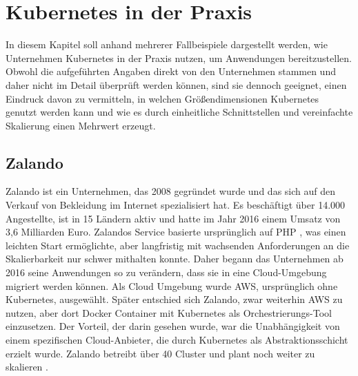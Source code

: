 \documentclass[11pt,a4paper]{article}
\begin{document}
\section{Kubernetes in der Praxis}
In diesem Kapitel soll anhand mehrerer Fallbeispiele dargestellt werden, wie Unternehmen
Kubernetes in der Praxis nutzen, um Anwendungen bereitzustellen.
Obwohl die aufgeführten Angaben direkt von den Unternehmen stammen und daher nicht im Detail
überprüft werden können, sind sie dennoch geeignet, einen Eindruck davon zu vermitteln,
in welchen Größendimensionen Kubernetes genutzt werden kann und wie es durch
einheitliche Schnittstellen und vereinfachte Skalierung
einen Mehrwert erzeugt.
\subsection{Zalando}
Zalando ist ein Unternehmen, das 2008 gegründet wurde und das sich auf den Verkauf
von Bekleidung im Internet spezialisiert hat. Es beschäftigt über 14.000 Angestellte,
ist in 15 Ländern aktiv und hatte im Jahr 2016 einem Umsatz von 3,6 Milliarden Euro.
Zalandos Service basierte ursprünglich auf PHP \cite{php}, was einen leichten Start ermöglichte,
aber langfristig mit wachsenden Anforderungen an die Skalierbarkeit nur schwer mithalten konnte.
Daher begann das Unternehmen ab 2016 seine Anwendungen so zu verändern, dass sie
in eine Cloud-Umgebung migriert werden können. Als Cloud Umgebung wurde AWS, %
ursprünglich ohne Kubernetes, ausgewählt. Später entschied sich Zalando,
zwar weiterhin AWS zu nutzen, aber dort Docker Container mit Kubernetes
als Orchestrierungs-Tool einzusetzen. Der Vorteil, der darin gesehen wurde,
war die Unabhängigkeit von einem spezifischen Cloud-Anbieter, die durch
Kubernetes als Abstraktionsschicht erzielt wurde.
Zalando betreibt über 40 Cluster und plant noch weiter zu skalieren \cite{story_zalando}.
\end{document}
